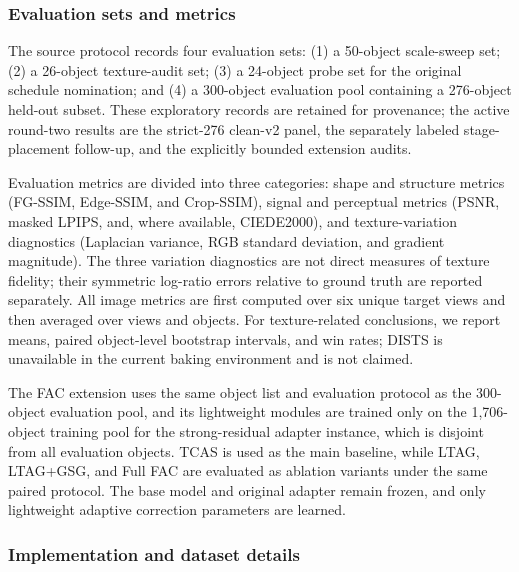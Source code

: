 \documentclass[times,twocolumn,final]{elsarticle}
\begin{document}
\subsubsection{Evaluation sets and metrics}

The source protocol records four evaluation sets: (1) a 50-object scale-sweep set; (2) a 26-object texture-audit set; (3) a 24-object probe set for the original schedule nomination; and (4) a 300-object evaluation pool containing a 276-object held-out subset. These exploratory records are retained for provenance; the active round-two results are the strict-276 clean-v2 panel, the separately labeled stage-placement follow-up, and the explicitly bounded extension audits.

Evaluation metrics are divided into three categories: shape and structure metrics (FG-SSIM, Edge-SSIM, and Crop-SSIM), signal and perceptual metrics (PSNR, masked LPIPS, and, where available, CIEDE2000), and texture-variation diagnostics (Laplacian variance, RGB standard deviation, and gradient magnitude). The three variation diagnostics are not direct measures of texture fidelity; their symmetric log-ratio errors relative to ground truth are reported separately. All image metrics are first computed over six unique target views and then averaged over views and objects. For texture-related conclusions, we report means, paired object-level bootstrap intervals, and win rates; DISTS is unavailable in the current baking environment and is not claimed.

The FAC extension uses the same object list and evaluation protocol as the 300-object evaluation pool, and its lightweight modules are trained only on the 1,706-object training pool for the strong-residual adapter instance, which is disjoint from all evaluation objects. TCAS is used as the main baseline, while LTAG, LTAG+GSG, and Full FAC are evaluated as ablation variants under the same paired protocol. The base model and original adapter remain frozen, and only lightweight adaptive correction parameters are learned.

\subsubsection{Implementation and dataset details}
\end{document}
